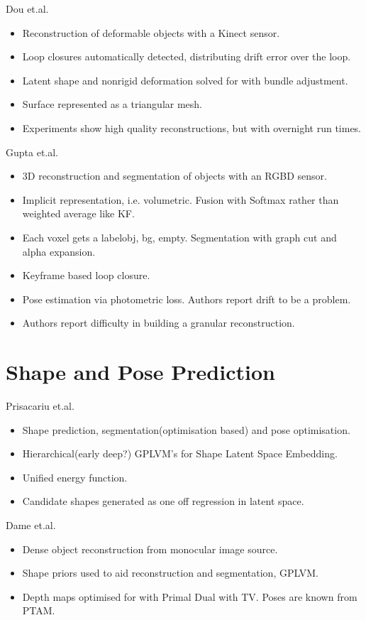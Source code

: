 Dou et.al. \cite{Dou2015}
\begin{itemize}
	\item Reconstruction of deformable objects with a Kinect sensor.
	\item Loop closures automatically detected, distributing drift error over the loop.
	\item Latent shape and nonrigid deformation solved for with bundle adjustment.
	\item Surface represented as a triangular mesh.
	\item Experiments show high quality reconstructions, but with overnight run times.
\end{itemize}

Gupta et.al. \cite{Gupta2016}
\begin{itemize}
	\item 3D reconstruction and segmentation of objects with an RGBD sensor.
	\item Implicit representation, i.e. volumetric. Fusion with Softmax rather than weighted average like KF.
	\item Each voxel gets a label{obj, bg, empty}. Segmentation with graph cut and alpha expansion.
	\item Keyframe based loop closure.
	\item Pose estimation via photometric loss. Authors report drift to be a problem.
	\item Authors report difficulty in building a granular reconstruction.
\end{itemize}

\section{Shape and Pose Prediction}
\label{sec:lit_review_prediction}

Prisacariu et.al. \cite{Prisacariu2011}
\begin{itemize}
	\item Shape prediction, segmentation(optimisation based) and pose optimisation.
	\item Hierarchical(early deep?) GPLVM's for Shape Latent Space Embedding. \cite{Lawrence2005}
	\item Unified energy function.
	\item Candidate shapes generated as one off regression in latent space.
\end{itemize}

Dame et.al. \cite{Dame2013}
\begin{itemize}
	\item Dense object reconstruction from monocular image source.
	\item Shape priors used to aid reconstruction and segmentation, GPLVM.
	\item Depth maps optimised for with Primal Dual with TV. Poses are known from PTAM.
\end{itemize}

